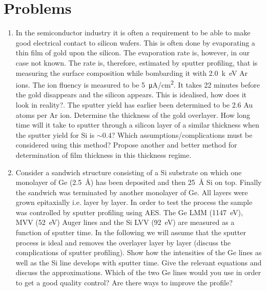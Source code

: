 \section{Problems}
\begin{enumerate}
\item In the semiconductor industry it is often a requirement to be able to make good electrical contact to silicon wafers. This is often done by evaporating a thin film of gold upon the silicon. The evaporation rate is, however, in our case not known. The rate is, therefore, estimated by sputter profiling, that is measuring the surface composition while bombarding it with \SI{2.0}{k\electronvolt} Ar ions. The ion fluency is measured to be \SI{5}{\micro A/cm^2}. It takes 22 minutes before the gold disappears and the silicon appears. This is idealised, how does it look in reality?. The sputter yield has earlier been determined to be 2.6 Au atoms per Ar ion. Determine the thickness of the gold overlayer. How long time will it take to sputter through a silicon layer of a similar thickness when the sputter yield for Si is  $\sim$0.4? Which assumptions/complications must be considered using this method? Propose another and better method for determination of film thickness in this thickness regime.

\item Consider a sandwich structure consisting of a Si substrate on which one monolayer of Ge (\SI{2.5}{\angstrom}) has been deposited and then \SI{25}{\angstrom} Si on top. Finally the sandwich was terminated by another monolayer of Ge. All layers were grown epitaxially i.e. layer by layer. In order to test the process the sample was controlled by sputter profiling using AES. The Ge LMM (\SI{1147}{\electronvolt}), MVV (\SI{52}{\electronvolt}) Auger lines and the Si LVV (\SI{92}{\electronvolt}) are measured as a function of sputter time. In the following we will assume that the sputter process is ideal and removes the overlayer layer by layer (discuss the complications of sputter profiling). Show how the intensities of the Ge lines as well as the Si line develops with sputter time. Give the relevant equations and discuss the approximations. Which of the two Ge lines would you use in order to get a good quality control? Are there ways to improve the profile?
\end{enumerate}
